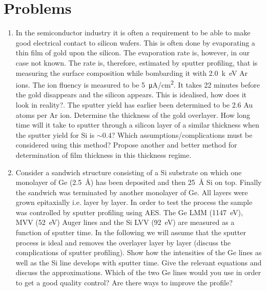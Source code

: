 \section{Problems}
\begin{enumerate}
\item In the semiconductor industry it is often a requirement to be able to make good electrical contact to silicon wafers. This is often done by evaporating a thin film of gold upon the silicon. The evaporation rate is, however, in our case not known. The rate is, therefore, estimated by sputter profiling, that is measuring the surface composition while bombarding it with \SI{2.0}{k\electronvolt} Ar ions. The ion fluency is measured to be \SI{5}{\micro A/cm^2}. It takes 22 minutes before the gold disappears and the silicon appears. This is idealised, how does it look in reality?. The sputter yield has earlier been determined to be 2.6 Au atoms per Ar ion. Determine the thickness of the gold overlayer. How long time will it take to sputter through a silicon layer of a similar thickness when the sputter yield for Si is  $\sim$0.4? Which assumptions/complications must be considered using this method? Propose another and better method for determination of film thickness in this thickness regime.

\item Consider a sandwich structure consisting of a Si substrate on which one monolayer of Ge (\SI{2.5}{\angstrom}) has been deposited and then \SI{25}{\angstrom} Si on top. Finally the sandwich was terminated by another monolayer of Ge. All layers were grown epitaxially i.e. layer by layer. In order to test the process the sample was controlled by sputter profiling using AES. The Ge LMM (\SI{1147}{\electronvolt}), MVV (\SI{52}{\electronvolt}) Auger lines and the Si LVV (\SI{92}{\electronvolt}) are measured as a function of sputter time. In the following we will assume that the sputter process is ideal and removes the overlayer layer by layer (discuss the complications of sputter profiling). Show how the intensities of the Ge lines as well as the Si line develops with sputter time. Give the relevant equations and discuss the approximations. Which of the two Ge lines would you use in order to get a good quality control? Are there ways to improve the profile?
\end{enumerate}
